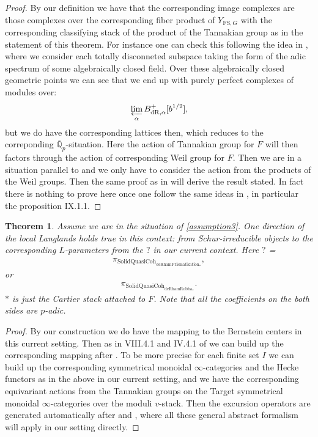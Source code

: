 \documentclass[12pt]{article}
\newtheorem{theorem}{Theorem}
\theoremstyle{definition}
\begin{document}
\begin{proof}
By our definition we have that the corresponding image complexes are those complexes over the corresponding fiber product of $Y_{\mathrm{FS},G}$ with the corresponding classifying stack of the product of the Tannakian group as in the statement of this theorem. For instance one can check this following the idea in \cite{1S5}, \cite{1S6} where we consider each totally disconneted subspace taking the form of the adic spectrum of some algebraically closed field. Over these algebraically closed geometric points we can see that we end up with purely perfect complexes of modules over:
\begin{align}
\varprojlim_\alpha B^+_\mathrm{dR,\alpha}[b^{1/2}],
\end{align}
but we do have the corresponding lattices then, which reduces to the correponding $\overline{\mathbb{Q}}_p$-situation. Here the action of Tannakian group for $F$ will then factors through the action of corresponding Weil group for $F$. Then we are in a situation parallel to \cite{1FS} and we only have to consider the action from the products of the Weil groups. Then the same proof as in \cite{1FS} will derive the result stated. In fact there is nothing to prove here once one follow the same ideas in \cite{1FS}, in particular the proposition IX.1.1.
\end{proof}

\begin{theorem}
Assume we are in the situation of \cref{assumption3}. One direction of the local Langlands holds true in this context: from Schur-irreducible objects to the corresponding $L$-parameters from the $?$ in our current context. Here $?$ = 
\begin{align}
\pi_{\mathrm{SolidQuasiCoh}_{\mathrm{deRhamPrismatization}_*}}, 
\end{align}
or 
\begin{align}
\pi_{\mathrm{SolidQuasiCoh}_{\mathrm{deRhamRobba}_*}}. 
\end{align}
$*$ is just the Cartier stack attached to $F$. Note that all the coefficients on the both sides are $p$-adic. 
\end{theorem}

\begin{proof}
By our construction we do have the mapping to the Bernstein centers in this current setting. Then as in VIII.4.1 and IV.4.1 of \cite{1FS} we can build up the corresponding mapping after \cite{1VL}. To be more precise for each finite set $I$ we can build up the corresponding symmetrical monoidal $\infty$-categories and the Hecke functors as in the above in our current setting, and we have the corresponding equivariant actions from the Tannakian groups on the Target symmetrical monoidal $\infty$-categories over the moduli $v$-stack. Then the excursion operators are generated automatically after \cite{1FS} and \cite{1VL}, where all these general abstract formalism will apply in our setting directly.
\end{proof}
\end{document}
